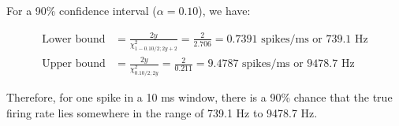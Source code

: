 For a 90\% confidence interval ($\alpha=0.10$), we have:

\begin{align*}
\text{Lower bound} &= \frac{2y}{\chi^2_{1-0.10/2;2y+2}} = \frac{2}{2.706} = 0.7391 \text{ spikes/ms or } 739.1 \text{ Hz} \\
\text{Upper bound} &= \frac{2y}{\chi^2_{0.10/2;2y}} = \frac{2}{0.211} = 9.4787 \text{ spikes/ms or } 9478.7 \text{ Hz}
\end{align*}

Therefore, for one spike in a 10 ms window, there is a 90\% chance that the true firing rate lies somewhere in the range of 739.1 Hz to 9478.7 Hz.
